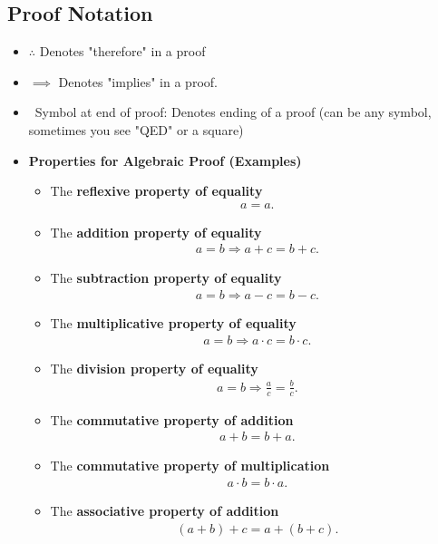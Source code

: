 \documentclass{report}
\begin{document}
      \bigbreak \noindent \bigbreak \noindent 
      \subsection{Proof Notation}
      \bigbreak \noindent 
      \begin{itemize}
        \item $\therefore$ Denotes "therefore" in a proof 
        \item $\implies$ Denotes "implies" in a proof. 
        \item \qedsymbol\ Symbol at end of proof: Denotes ending of a proof (can be any symbol, sometimes you see "QED" or a square)
        \item \textbf{Properties for Algebraic Proof (Examples)}
        \begin{itemize}
          \item The \textbf{reflexive property of equality} 
            \begin{align*}
              a = a
            .\end{align*}
          \item The \textbf{addition property of equality} 
            \begin{align*}
              a = b \Rightarrow a + c = b + c 
            .\end{align*}
          \item The \textbf{subtraction property of equality} 
            \begin{align*}
              a = b \Rightarrow a - c = b - c 
            .\end{align*}
          \item The \textbf{multiplicative property of equality} 
            \begin{align*}
              a = b \Rightarrow a \cdot c = b \cdot c 
            .\end{align*}
            \item The \textbf{division property of equality} 
              \begin{align*}
                a = b \Rightarrow \frac{a}{c} = \frac{b}{c}
              .\end{align*}
            \item The \textbf{commutative property of addition} 
              \begin{align*}
                a + b = b + a
              .\end{align*}
            \item The \textbf{commutative property of multiplication} 
              \begin{align*}
                a \cdot b = b \cdot a 
              .\end{align*}
            \item The \textbf{associative property of addition} 
              \begin{align*}
                (a + b) + c = a + (b + c) 
              .\end{align*}


\end{itemize}
\end{itemize}
\end{document}
